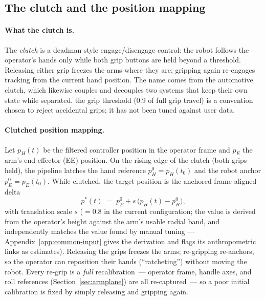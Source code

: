 \subsection{The clutch and the position mapping}
\label{sec:clutch}

\paragraph{What the clutch is.}
The \emph{clutch} is a deadman-style engage/disengage control: the robot
follows the operator's hands only while both grip buttons are held
beyond a threshold. Releasing either grip freezes the arms where they
are; gripping again re-engages tracking from the current hand position.
The name comes from the automotive clutch, which likewise couples and
decouples two systems that keep their own state while separated.
\unjustified{} the grip threshold (0.9 of full grip
travel) is a convention chosen to reject accidental grips; it has not
been tuned against user data.

\paragraph{Clutched position mapping.}
Let \(p_H(t)\) be the filtered controller position in the operator frame
and \(p_E\) the arm's end-effector (EE) position. On the rising edge of
the clutch (both grips held), the pipeline latches the hand reference
\(p_H^0 = p_H(t_0)\) and the robot anchor \(p_E^0 = p_E(t_0)\). While
clutched, the target position is the anchored frame-aligned delta
\begin{equation}
  p^\ast(t) \;=\; p_E^0 + s\,\bigl(p_H(t) - p_H^0\bigr),
  \label{eq:clutch}
\end{equation}
with translation scale \(s\) (\(=0.8\) in the current configuration; the
value is derived from the operator's height against the arm's usable
radial band, and independently matches the value found by manual tuning
--- Appendix~\ref{app:common-input} gives the derivation and flags its
anthropometric links as estimates).
Releasing the grips freezes the arms; re-gripping re-anchors, so the
operator can reposition their hands (``ratcheting'') without moving the
robot. Every re-grip is a \emph{full} recalibration~--- operator frame,
handle axes, and roll references (Section~\ref{sec:armplane}) are all
re-captured~--- so a poor initial calibration is fixed by simply
releasing and gripping again.

